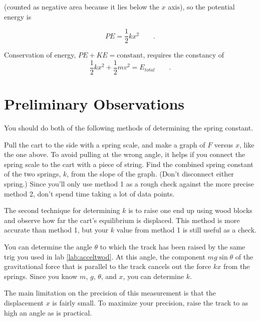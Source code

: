 (counted as negative area because it lies below the $x$
axis), so the potential energy is

\label{spring-constant}

\begin{equation*}
      PE  =   \frac{1}{2}kx^2  \qquad   .  
\end{equation*}

Conservation of energy, $PE+KE=\text{constant}$, requires the constancy of
\begin{equation*}
      \frac{1}{2}kx^2+\frac{1}{2}mv^2 = E_{total}  \qquad   .  
\end{equation*}

\section{Preliminary Observations}

You should do both of the following methods of determining
the spring constant.


Pull the cart to the side with a spring scale, and make
a graph of $F$ versus $x$, like the one above.
To avoid pulling at the wrong angle, it helps if you connect the spring scale
to the cart with a piece of string.
Find the combined spring constant of the two springs, $k$, from the slope of the graph. (Don't
disconnect either spring.) Since you'll only use method 1 as a rough check against the
more precise method 2, don't spend time taking a lot of data points.


The second technique for determining $k$ is to raise one end up
using wood blocks and observe how far the cart's equilibrium is displaced.
This method is more accurate than method 1, but your $k$ value from
method 1 is still useful as a check.

You can determine the angle $\theta$ to which the track has been raised by the same
trig you used in lab \ref{lab:acceltwod}. At this angle, the component $mg\sin\theta$
of the gravitational force that is parallel to the track cancels out the force
$kx$ from the springs. Since you know $m$, $g$, $\theta$, and $x$, you can determine
$k$.

The main limitation on the precision of this measurement is that the displacement $x$
is fairly small. To maximize your precision, raise the track to as high an angle as
is practical.

